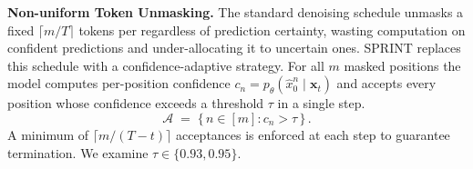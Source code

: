 \noindent
\textbf{Non-uniform Token Unmasking.}\label{sec:sprint_ntu}
The standard denoising schedule unmasks a fixed $\lceil m / T \rceil$ tokens per regardless of prediction certainty, wasting computation on confident predictions and under-allocating it to uncertain ones.
SPRINT replaces this schedule with a confidence-adaptive strategy. For all $m$ masked positions the model computes per-position confidence $c_n = p_\theta(\hat{x}_0^n \mid \mathbf{x}_t)$ and accepts every position whose confidence exceeds a threshold $\tau$ in a single step.
\begin{equation}\label{eq:adaptive_fast}
    \mathcal{A} \;=\; \bigl\{\,n \in [m] : c_n > \tau \,\bigr\} \,.
\end{equation}
A minimum of $\lceil m / (T - t) \rceil$ acceptances is enforced at each step to guarantee termination. We examine $\tau \in \{0.93, 0.95\}$.

